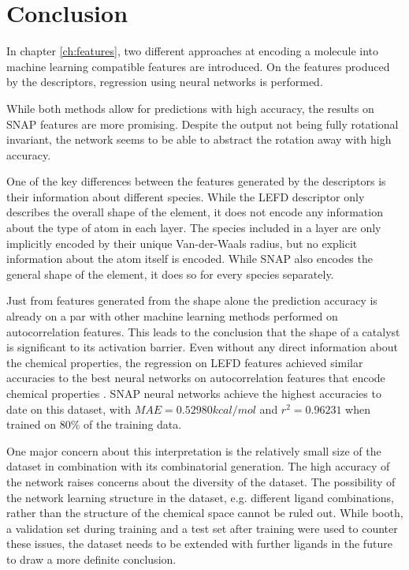 
\chapter{Conclusion}
\label{ch:Conclusion}
In chapter \ref{ch:features}, two different approaches at encoding a molecule into machine learning compatible features are introduced.
On the features produced by the descriptors, regression using neural networks is performed.

While both methods allow for predictions with high accuracy, the results on SNAP features are more promising.
Despite the output not being fully rotational invariant, the network seems to be able to abstract the rotation away with high accuracy.

One of the key differences between the features generated by the descriptors is their information about 
different species.
While the LEFD descriptor only describes the overall shape of the element, it does not encode any information about the 
type of atom in each layer.
The species included in a layer are only implicitly encoded by their unique Van-der-Waals radius, but no explicit information about the 
atom itself is encoded.
While SNAP also encodes the general shape of the element, it does so for every species separately.

Just from features generated from the shape alone the prediction accuracy is already on a par with other machine learning methods performed on autocorrelation features.
This leads to the conclusion that the shape of a catalyst is significant to its activation barrier.
Even without any direct information about the chemical properties, the regression on LEFD features achieved similar accuracies to
the best neural networks on autocorrelation features that encode chemical properties \cite{friederich_dos}.
SNAP neural networks achieve the highest accuracies to date on this dataset, with 
$MAE = 0.52980 kcal/mol$ and $r^2=0.96231$ when trained on 80\% of the training data.

One major concern about this interpretation is the relatively small size of the dataset in combination 
with its combinatorial generation.
The high accuracy of the network raises concerns about the diversity of the dataset.
The possibility of the network learning structure in the dataset, e.g. different ligand combinations,
rather than the structure of the chemical space cannot be ruled out.
While booth, a validation set during training and a test set after training were used to counter these issues,
the dataset needs to be extended with further ligands in the future to draw a more definite conclusion.


